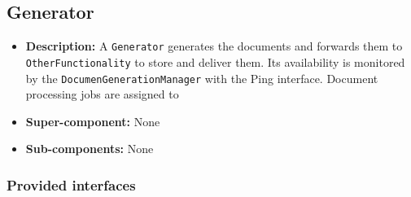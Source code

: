 \documentclass[a4paper,10pt]{article}
\begin{document}
\subsection{Generator}
\begin{itemize}
    \item \textbf{Description:} A \texttt{Generator} generates the documents and forwards them to \texttt{OtherFunctionality} to store and deliver them. Its availability is monitored by the \texttt{DocumenGenerationManager} with the Ping interface. Document processing jobs are assigned to 
    \item \textbf{Super-component:} None
    \item \textbf{Sub-components:} None
\end{itemize}

\subsubsection*{Provided interfaces}
\end{document}
